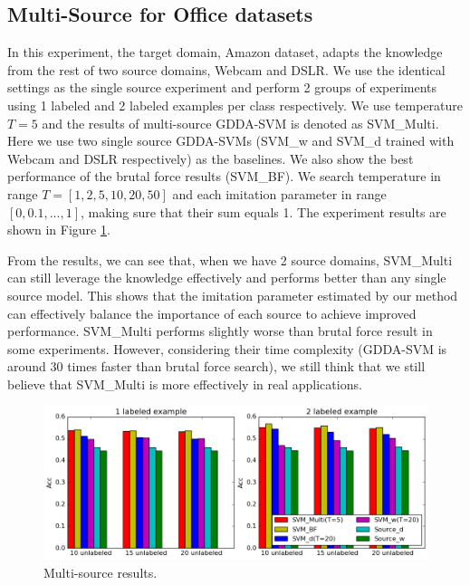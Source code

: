 \subsection{Multi-Source for Office datasets}
In this experiment, the target domain, Amazon dataset, adapts the knowledge from the rest of two source domains, Webcam and DSLR.
We use the identical settings as the single source experiment and perform 2 groups of experiments using 1 labeled and 2 labeled examples per class respectively. We use temperature $T=5$ and the results of multi-source GDDA-SVM is denoted as SVM\_Multi. Here we use two single source GDDA-SVMs (SVM\_w and SVM\_d trained with Webcam and DSLR respectively) as the baselines. We also show the best performance of the brutal force results (SVM\_BF). We search temperature in range $T=[1,2,5,10,20,50]$ and each imitation parameter in range $[0,0.1,...,1]$, making sure that their sum equals 1. The experiment results are shown in Figure \ref{fig:multi}.

From the results, we can see that, when we have 2 source domains, SVM\_Multi can still leverage the knowledge effectively and performs better than any single source model. This shows that the imitation parameter estimated by our method can effectively balance the importance of each source to achieve improved performance. SVM\_Multi performs slightly worse than brutal force result in some experiments. However, considering their time complexity (GDDA-SVM is around 30 times faster than brutal force search), we still think that we still believe that SVM\_Multi is more effectively in real applications.
\begin{figure}
\centering
\includegraphics[scale=.3]{figure/cmp.png}
\caption{Multi-source results.}\label{fig:multi}
\end{figure}



